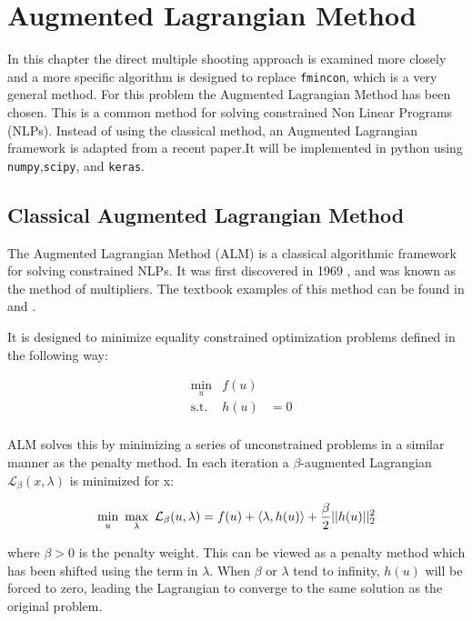 \chapter{Augmented Lagrangian Method}
\label{cha:2}
In this chapter the direct multiple shooting approach is examined more closely and a more specific algorithm is designed to replace \texttt{fmincon}, which is a very general method. For this problem the Augmented Lagrangian Method has been chosen. This is a common method for solving constrained Non Linear Programs (NLPs). Instead of using the classical method, an Augmented Lagrangian framework is adapted from a recent paper\cite{sahin2019}.It will be implemented in python using \texttt{numpy},\texttt{scipy}, and \texttt{keras}.

\section{Classical Augmented Lagrangian Method}
The Augmented Lagrangian Method (ALM) is a classical algorithmic framework for solving constrained NLPs. It was first discovered in 1969 \cite{Hestenes1969},\cite{Powell1969} and was known as the method of multipliers. The textbook examples of this method can be found in \cite{Birgin2009} and \cite{bertsekas2014constrained}.

It is designed to minimize equality constrained optimization problems defined in the following way:

\begin{equation}
	\begin{aligned}
	& \underset{u}{\text{min}} & f(u) & \\
	& \text{s.t.} & h(u) &= 0 \\
	\end{aligned}
\end{equation}

ALM solves this by minimizing a series of unconstrained problems in a similar manner as the penalty method. In each iteration a $\beta$-augmented Lagrangian $\mathcal{L}_\beta(x,\lambda)$ is minimized for x:

\begin{equation}
	\underset{u}{\text{min}} \hspace{.5em} \underset{\lambda}{\text{max}} \hspace{.5em}  \mathcal{L}_\beta(u,\lambda) = f(u) + \langle\lambda,h(u)\rangle + \frac{\beta}{2} || h(u) ||^2_2
\end{equation}

where $\beta>0$ is the penalty weight. This can be viewed as a penalty method which has been shifted using the term in $\lambda$\cite{Birgin2009}. When $\beta$ or $\lambda$ tend to infinity, $h(u)$ will be forced to zero, leading the Lagrangian to converge to the same solution as the original problem.

